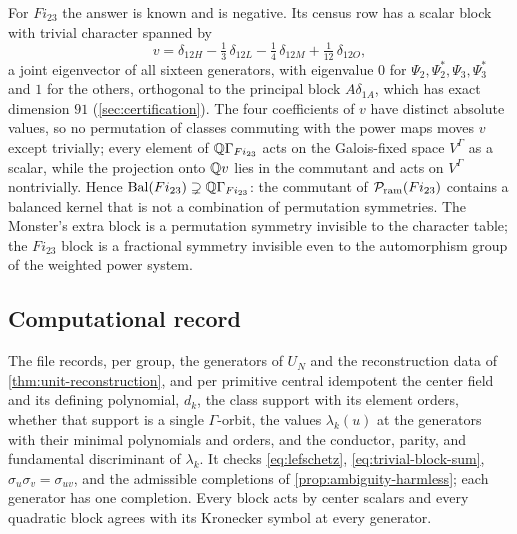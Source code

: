 For \(Fi_{23}\) the answer is known and is negative.  Its census row has a
scalar block with trivial character spanned by
\[
 v=\delta_{12H}-\tfrac13\,\delta_{12L}-\tfrac14\,\delta_{12M}
   +\tfrac1{12}\,\delta_{12O},
\]
a joint eigenvector of all sixteen generators, with eigenvalue \(0\) for
\(\Psi_2,\Psi_2^*,\Psi_3,\Psi_3^*\) and \(1\) for the others, orthogonal to
the principal block \(A\delta_{1A}\), which has exact dimension \(91\)
(\cref{sec:certification}).  The four coefficients of \(v\) have distinct
absolute values, so no permutation of classes commuting with the power maps
moves \(v\) except trivially; every element of \(\mathbb Q\Gamma_{Fi_{23}}\) acts
on the Galois-fixed space \(V^\Gamma\) as a scalar, while the projection
onto \(\mathbb Q v\) lies in the commutant and acts on \(V^\Gamma\) nontrivially.
Hence \(\operatorname{Bal}(Fi_{23})\supsetneq\mathbb Q\Gamma_{Fi_{23}}\): the commutant of
\(\mathcal P_{\mathrm{ram}}(Fi_{23})\) contains a balanced kernel that is not a combination of
permutation symmetries.  The Monster's extra block is a permutation
symmetry invisible to the character table; the \(Fi_{23}\) block is a
fractional symmetry invisible even to the automorphism group of the weighted
power system.

\subsection{Computational record}
\label{sec:characters-record}

The file  records, per group, the generators
of \(U_N\) and the reconstruction data of \cref{thm:unit-reconstruction}, and
per primitive central idempotent the center field and its defining
polynomial, \(d_k\), the class support with its element orders, whether that
support is a single \(\Gamma\)-orbit, the values \(\lambda_k(u)\) at the
generators with their minimal polynomials and orders, and the conductor,
parity, and fundamental discriminant of \(\lambda_k\).  It checks
\eqref{eq:lefschetz}, \eqref{eq:trivial-block-sum},
\(\sigma_u\sigma_v=\sigma_{uv}\), and the admissible completions of
\cref{prop:ambiguity-harmless}; each generator has one completion.  Every
block acts by center scalars and every quadratic block agrees with its
Kronecker symbol at every generator.
